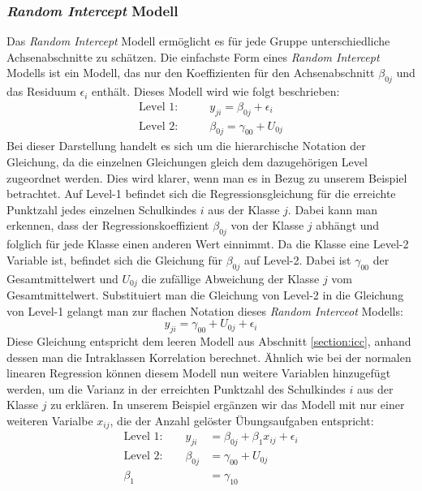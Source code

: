 \documentclass[12pt]{article}\usepackage[]{graphicx}\usepackage[]{color}
\numberwithin{equation}{section}
\begin{document}
\subsubsection{\textit{Random Intercept} Modell} \label{section:random_intercept_model}
Das \textit{Random Intercept} Modell ermöglicht es für jede Gruppe unterschiedliche Achsenabschnitte zu schätzen. Die einfachste Form eines \textit{Random Intercept} Modells ist ein Modell, das nur den Koeffizienten für den Achsenabschnitt $\beta_{0j}$ und das Residuum $\epsilon_i$ enthält. Dieses Modell wird wie folgt beschrieben:
\begin{equation}
\begin{split}	
\text{Level 1:} & \qquad y_{ji} = \beta_{0j} + \epsilon_{i}\\
\text{Level 2:} & \qquad \beta_{0j} = \gamma_{00} + U_{0j}
\end{split}	
\end{equation} 
Bei dieser Darstellung handelt es sich um die hierarchische Notation der Gleichung, da die einzelnen Gleichungen gleich dem dazugehörigen Level zugeordnet werden. Dies wird klarer, wenn man es in Bezug zu unserem Beispiel betrachtet. Auf Level-1 befindet sich die Regressionsgleichung für die erreichte Punktzahl jedes einzelnen Schulkindes $i$ aus der Klasse $j$. Dabei kann man erkennen, dass der Regressionskoeffizient $\beta_{0j}$ von der Klasse $j$ abhängt und folglich für jede Klasse einen anderen Wert einnimmt. Da die Klasse eine Level-2 Variable ist, befindet sich die Gleichung für $\beta_{0j}$ auf Level-2. Dabei ist $\gamma_{00}$ der Gesamtmittelwert und $U_{0j}$ die zufällige Abweichung der Klasse $j$ vom Gesamtmittelwert. Substituiert man die Gleichung von Level-2 in die Gleichung von Level-1 gelangt man zur flachen Notation dieses \textit{Random Interceot} Modells:
\begin{equation}
y_{ji} = \gamma_{00} + U_{0j} + \epsilon_{i}
\end{equation}
Diese Gleichung entspricht dem leeren Modell aus Abschnitt \ref{section:icc}, anhand dessen man die Intraklassen Korrelation berechnet. Ähnlich wie bei der normalen linearen Regression können diesem Modell nun weitere Variablen hinzugefügt werden, um die Varianz in der erreichten Punktzahl des Schulkindes $i$ aus der Klasse $j$ zu erklären. In unserem Beispiel ergänzen wir das Modell mit nur einer weiteren Varialbe $x_{ij}$, die der Anzahl gelöster Übungsaufgaben entspricht:
\begin{equation}
\begin{split}	
 \text{Level 1:}  \qquad y_{ji} & = \beta_{0j} + \beta_{1}x_{ij} + \epsilon_{i}\\
 \text{Level 2:} \qquad \beta_{0j} & = \gamma_{00} + U_{0j}\\
 \beta_{1} & = \gamma_{10}
\end{split}	
\end{equation} 
\end{document}
